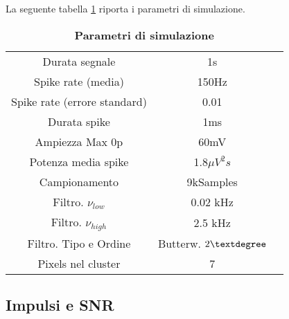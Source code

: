\documentclass[9pt,twocolumn,twoside]{osajnl}
\begin{document}
La seguente tabella \ref{tab:param} riporta i parametri di simulazione.

\begin{table}[htbp]
\centering
\caption{\bf Parametri di simulazione}
\begin{tabular}{ccc}
\hline
Durata segnale                  & 1s                \\
Spike rate (media)              & 150Hz             \\
Spike rate (errore standard)    & 0.01              \\
Durata spike                    & 1ms               \\
Ampiezza Max 0p                 & 60mV              \\
Potenza media spike             & 1.8$\mu V^{2}s$   \\
Campionamento                   & 9kSamples         \\
Filtro. $\nu_{low}$             & 0.02 kHz          \\
Filtro. $\nu_{high}$            & 2.5 kHz           \\
Filtro. Tipo e Ordine           & Butterw. $2\textdegree$ \\
Pixels nel cluster              & 7                 \\
\hline
\end{tabular}
\label{tab:param}
\end{table}



\subsection{Impulsi e SNR}
\end{document}
